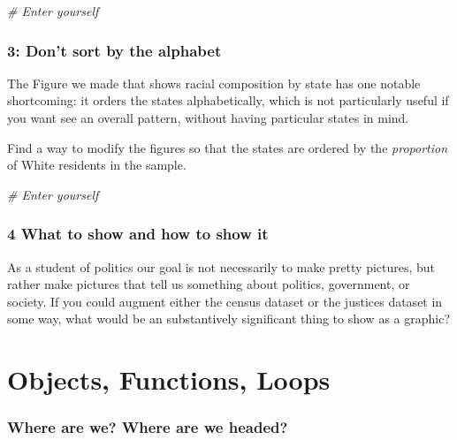 \documentclass[]{book}
\newenvironment{Shaded}{\begin{snugshade}}{\end{snugshade}}
\newcommand{\CommentTok}[1]{\textcolor[rgb]{0.56,0.35,0.01}{\textit{#1}}}
\theoremstyle{definition}
\theoremstyle{definition}
\theoremstyle{definition}
\theoremstyle{remark}
\begin{document}
\begin{Shaded}
\begin{Highlighting}[]
\CommentTok{# Enter yourself}
\end{Highlighting}
\end{Shaded}

\hypertarget{dont-sort-by-the-alphabet}{%
\subsection*{3: Don't sort by the alphabet}\label{dont-sort-by-the-alphabet}}

The Figure we made that shows racial composition by state has one notable shortcoming: it orders the states alphabetically, which is not particularly useful if you want see an overall pattern, without having particular states in mind.

Find a way to modify the figures so that the states are ordered by the \emph{proportion} of White residents in the sample.

\begin{Shaded}
\begin{Highlighting}[]
\CommentTok{# Enter yourself}
\end{Highlighting}
\end{Shaded}

\hypertarget{what-to-show-and-how-to-show-it}{%
\subsection*{4 What to show and how to show it}\label{what-to-show-and-how-to-show-it}}

As a student of politics our goal is not necessarily to make pretty pictures, but rather make pictures that tell us something about politics, government, or society. If you could augment either the census dataset or the justices dataset in some way, what would be an substantively significant thing to show as a graphic?

\hypertarget{robjloops}{%
\chapter{Objects, Functions, Loops}\label{robjloops}}

\hypertarget{where-are-we-where-are-we-headed-3}{%
\subsection*{Where are we? Where are we headed?}\label{where-are-we-where-are-we-headed-3}}
\end{document}
